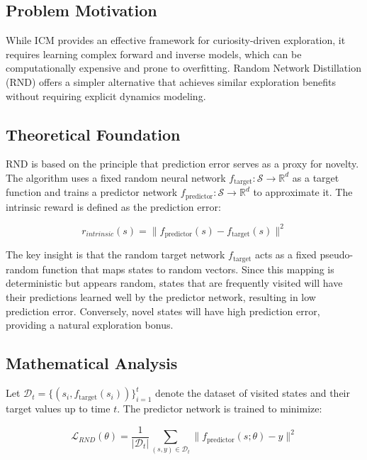 \documentclass[12pt]{article}
\begin{document}
{{{\subsection{Problem Motivation}

While ICM provides an effective framework for curiosity-driven exploration, it requires learning complex forward and inverse models, which can be computationally expensive and prone to overfitting. Random Network Distillation (RND) offers a simpler alternative that achieves similar exploration benefits without requiring explicit dynamics modeling.

\subsection{Theoretical Foundation}

RND is based on the principle that prediction error serves as a proxy for novelty. The algorithm uses a fixed random neural network $f_{\text{target}}: \mathcal{S} \rightarrow \mathbb{R}^d$ as a target function and trains a predictor network $f_{\text{predictor}}: \mathcal{S} \rightarrow \mathbb{R}^d$ to approximate it. The intrinsic reward is defined as the prediction error:

\begin{equation}
r_{intrinsic}(s) = \| f_{\text{predictor}}(s) - f_{\text{target}}(s) \|^2
\end{equation}

The key insight is that the random target network $f_{\text{target}}$ acts as a fixed pseudo-random function that maps states to random vectors. Since this mapping is deterministic but appears random, states that are frequently visited will have their predictions learned well by the predictor network, resulting in low prediction error. Conversely, novel states will have high prediction error, providing a natural exploration bonus.

\subsection{Mathematical Analysis}

Let $\mathcal{D}_t = \{(s_i, f_{\text{target}}(s_i))\}_{i=1}^t$ denote the dataset of visited states and their target values up to time $t$. The predictor network is trained to minimize:

\begin{equation}
\mathcal{L}_{RND}(\theta) = \frac{1}{|\mathcal{D}_t|} \sum_{(s, y) \in \mathcal{D}_t} \| f_{\text{predictor}}(s; \theta) - y \|^2
\end{equation}

}}}
\end{document}
